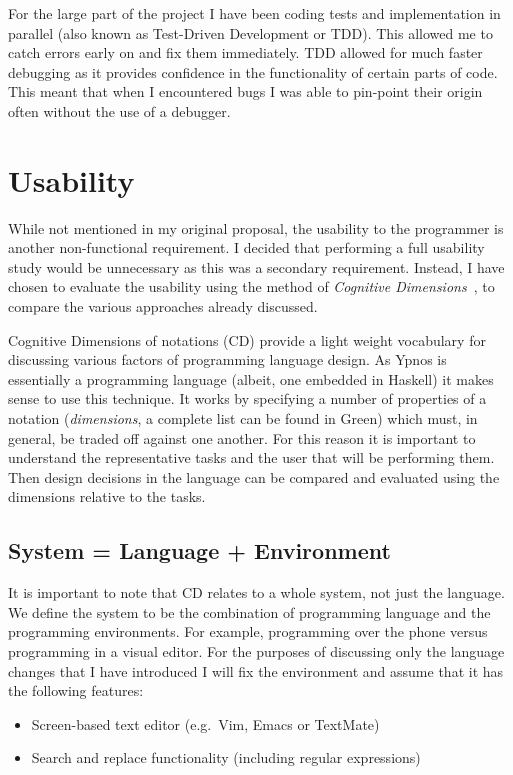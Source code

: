 \documentclass[12pt,a4paper,twoside]{scrbook}
\begin{document}
For the large part of the project I have been coding tests and
implementation in parallel (also known as Test-Driven Development or
TDD). This allowed me to catch errors early on and fix them immediately.
TDD allowed for much faster debugging as it provides confidence in the
functionality of certain parts of code. This meant that when I
encountered bugs I was able to pin-point their origin often without the
use of a debugger.

\section{Usability}

While not mentioned in my original proposal, the usability to the programmer is
another non-functional requirement. I decided that performing a full usability
study would be unnecessary as this was a secondary requirement. Instead, I have
chosen to evaluate the usability using the method of \emph{Cognitive
  Dimensions}~\cite{green96}, to compare the various approaches already
discussed.

Cognitive Dimensions of notations (CD) provide a light weight vocabulary for
discussing various factors of programming language design. As Ypnos is
essentially a programming language (albeit, one embedded in Haskell) it makes
sense to use this technique. It works by specifying a number of properties of a
notation (\emph{dimensions}, a complete list can be found in
Green\cite{green96}) which must, in general, be traded off against one
another. For this reason it is important to understand the representative tasks
and the user that will be performing them. Then design decisions in the language
can be compared and evaluated using the dimensions relative to the tasks.

\subsection{System = Language + Environment}

It is important to note that CD relates to a whole system, not just the
language. We define the system to be the combination of programming language and
the programming environments. For example, programming over the phone versus
programming in a visual editor. For the purposes of discussing only the language
changes that I have introduced I will fix the environment and assume that it has
the following features:

\begin{itemize}
\item
  Screen-based text editor (e.g.~Vim, Emacs or TextMate)
\item
  Search and replace functionality (including regular expressions)
\end{itemize}
\end{document}
